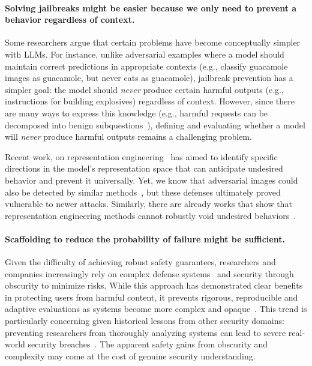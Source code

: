 \paragraph{Solving jailbreaks might be easier because we only need to prevent a behavior regardless of context.} Some researchers argue that certain problems have become conceptually simpler with LLMs. For instance, unlike adversarial examples where a model should maintain correct predictions in appropriate contexts (e.g., classify guacamole images as guacamole, but never cats as guacamole), jailbreak prevention has a simpler goal: the model should \emph{never} produce certain harmful outputs (e.g., instructions for building explosives) regardless of context. However, since there are many ways to express this knowledge (e.g., harmful requests can be decomposed into benign subquestions~\citep{glukhov2024breach}), defining and evaluating whether a model will \emph{never} produce harmful outputs remains a challenging problem.

Recent work, on representation engineering~\citep{arditi2024refusal,zou2024improving,tamirisa2024tamper} has aimed to identify specific directions in the model's representation space that can anticipate undesired behavior and prevent it universally. Yet, we know that adversarial images could also be detected by similar methods~\citep{carlini2017towards}, but these defenses ultimately proved vulnerable to newer attacks. Similarly, there are already works that show that representation engineering methods cannot robustly void undesired behaviors~\citep{li2024llm,qi2024evaluating}.

\paragraph{Scaffolding to reduce the probability of failure might be sufficient.} Given the difficulty of achieving robust safety guarantees, researchers and companies increasingly rely on complex defense systems~\citep{sharma2025constitutional} and security through obscurity to minimize risks. While this approach has demonstrated clear benefits in protecting users from harmful content, it prevents rigorous, reproducible and adaptive evaluations as systems become more complex and opaque~\citep{casper2024black}. This trend is particularly concerning given historical lessons from other security domains: preventing researchers from thoroughly analyzing systems can lead to severe real-world security breaches~\citep{swire2004model,mulligan2007magnificence,payne2020despite}. The apparent safety gains from obscurity and complexity may come at the cost of genuine security understanding.

